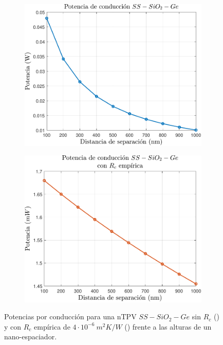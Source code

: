 \begin{figure}[H]
	\centering
	\begin{subfigure}[b]{0.49\textwidth}
		\centering
			\includegraphics[width=1.00\textwidth]{Pn_SsSiO2Ge.pdf}
		\caption{ }
		\label{fig:Pn_SsSiO2Ge}
	\end{subfigure}
	\hfill
	\begin{subfigure}[b]{0.49\textwidth}
		\centering
			\includegraphics[width=1.00\textwidth]{Prc_SsSiO2Ge_Emp.pdf}
		\caption{ }
		\label{fig:Prc_SsSiO2Ge_Emp}
	\end{subfigure}
	\caption{Potencias por conducción para una nTPV $SS-SiO_2-Ge$ sin $R_c$ () y con $R_c$ empírica de $4\cdot 10^{-6} \ m^2 K/W$ () frente a las alturas de un nano-espaciador.}
	\label{fig:Pcond1_SsSiO2Ge}
\end{figure}
